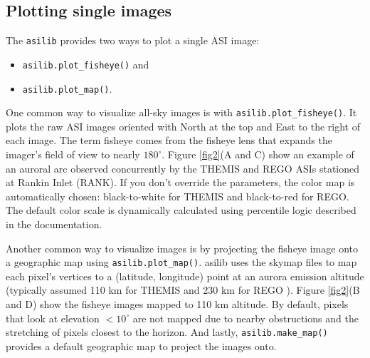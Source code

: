 \documentclass[utf8]{FrontiersinHarvard} %
\begin{document}
\subsection{Plotting single images}

The \verb|asilib| provides two ways to plot a single ASI image:

\begin{itemize}
      \item \verb|asilib.plot_fisheye()| and
      \item \verb|asilib.plot_map()|.
\end{itemize}

One common way to visualize all-sky images is with \verb|asilib.plot_fisheye()|. It plots the raw ASI images oriented with North at the top and East to the right of each image. The term fisheye comes from the fisheye lens that expands the imager's field of view to nearly $180^\circ$. Figure \ref{fig2}(A and C) show an example of an auroral arc observed concurrently by the THEMIS and REGO ASIs stationed at Rankin Inlet (RANK). If you don't override the parameters, the color map is automatically chosen: black-to-white for THEMIS and black-to-red for REGO. The default color scale is dynamically calculated using percentile logic described in the documentation.

Another common way to visualize images is by projecting the fisheye image onto a geographic map using \verb|asilib.plot_map()|. asilib uses the skymap files to map each pixel's vertices to a (latitude, longitude) point at an aurora emission altitude (typically assumed 110 km for THEMIS and 230 km for REGO \cite{Donovan2006, Liang2016}). Figure \ref{fig2}(B and D) show the fisheye images mapped to 110 km altitude. By default, pixels that look at elevation $< 10^\circ$ are not mapped due to nearby obstructions and the stretching of pixels closest to the horizon. And lastly, \verb|asilib.make_map()| provides a default geographic map to project the images onto.
\end{document}
